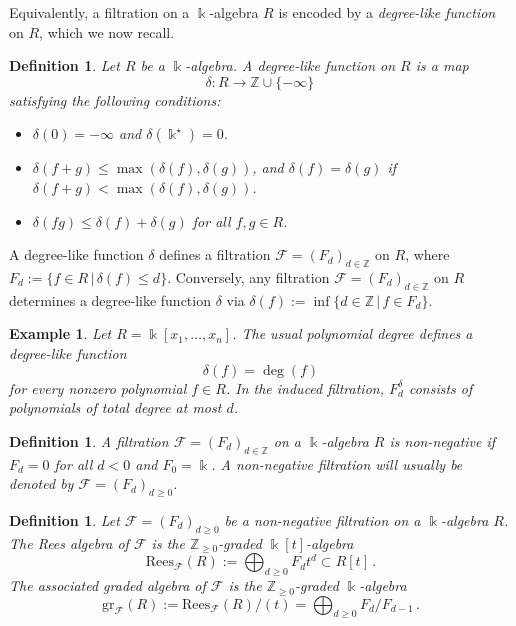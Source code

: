 \documentclass[12pt,letterpaper, reqno]{amsart}
\theoremstyle{defstyle} \newtheorem{definition}[theorem]{Definition}
\newtheorem{example}[theorem]{Example}
\theoremstyle{remark}
\numberwithin{equation}{section}
\numberwithin{figure}{section}
\newcommand{\cF} {\mathcal{F}}
\newcommand{\kk} {\Bbbk}
\newcommand{\ZZ} {\mathbb{Z}}
\begin{document}
Equivalently, a filtration on a \(\kk\)-algebra \(R\) is encoded by a \emph{degree-like function} on \(R\), which we now recall.

\begin{definition}
Let $R$ be a $\kk$-algebra. A \emph{degree-like function} on $R$ is a map 
\[\delta: R \longrightarrow \ZZ \cup \{-\infty\} \,\]
satisfying the following conditions:
\begin{itemize}
    \item[(i)] $\delta(0)=-\infty$ and $\delta(\kk^\star)=0$.
    \item[(ii)] $\delta(f+g) \leq \max(\delta(f),\delta(g))$, and $\delta(f)=\delta(g)$ if $\delta(f+g) < \max(\delta(f),\delta(g))$.
    \item[(iii)] $\delta(fg) \leq \delta(f) + \delta(g)$ for all $f,g \in R$.
\end{itemize}
\end{definition}

A degree-like function $\delta$ defines a filtration $\cF=(F_d)_{d\in \ZZ}$ on $R$, where $F_d :=\{ f \in R\,|\, \delta(f) \leq d \}$. 
Conversely, any filtration $\cF=(F_d)_{d \in \ZZ}$ on $R$ determines a degree-like function $\delta$ via $\delta(f):=\inf \{d \in \ZZ \,|\, f \in F_d \}$.
    


\begin{example}
    \label{Ex:degree like function}
Let \(R=\kk[x_1,\dots,x_n]\). The usual polynomial degree defines a degree-like function
\[ \delta(f)=\deg(f)
\]
for every nonzero polynomial \(f \in R\). In the induced filtration,
$F_d^{\delta}$ consists of polynomials of total degree at most \(d\). 
\end{example}

\begin{definition}
    A filtration $\cF=(F_d)_{d\in \ZZ}$ on a $\kk$-algebra $R$ is \emph{non-negative} if $F_d =0$ for all $d<0$ and $F_0=\kk$. A non-negative filtration will usually be denoted by $\cF=(F_d)_{d\geq 0}$.
\end{definition}

\begin{definition}
    Let $\cF=(F_d)_{d \geq 0}$ be a non-negative filtration on a $\kk$-algebra $R$. The  \emph{Rees algebra} of $\cF$
    is the $\ZZ_{\geq 0}$-graded $\kk[t]$-algebra
    \begin{equation} \label{eq_rees}
    \mathrm{Rees}_\cF(R) := \bigoplus_{d \geq 0} F_d t^d \subset R[t]\,.\end{equation}
 The \emph{associated graded algebra} of $\cF$ is the $\ZZ_{\geq 0}$-graded $\kk$-algebra
\[ \mathrm{gr}_\cF(R) := \mathrm{Rees}_\cF(R)/(t) = \bigoplus_{d\geq 0} F_d /F_{d-1}  \,.\]
\end{definition}
\end{document}
